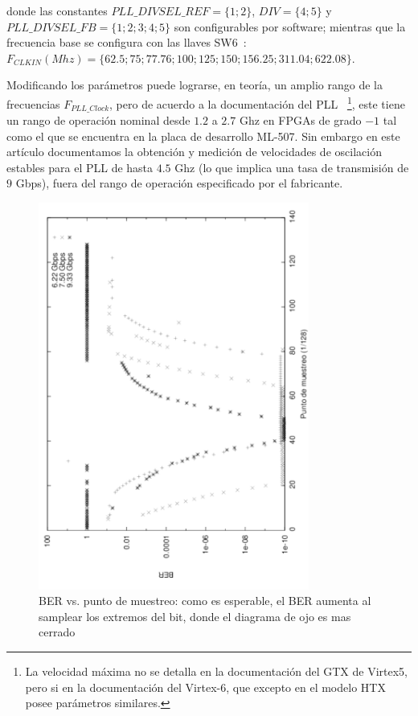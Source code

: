donde las constantes $PLL\_DIVSEL\_REF = \{1;2\}$, $DIV = \{4;5\} $ y
$PLL\_DIVSEL\_FB = \{1;2;3;4;5\}$ son configurables por software;
mientras que la frecuencia base se configura con las llaves
SW6~\cite[Tabla 1-32]{ug347}: $
F_{CLKIN} (Mhz)= \{62.5;75;77.76;100;125;150;156.25;311.04;622.08\}$.


 Modificando los parámetros puede lograrse, en teoría, un amplio rango
de la frecuencias $F_{PLL\_Clock}$, pero de acuerdo a la documentación
del PLL \cite[Pág. 71]{ug366}~\footnote{La velocidad máxima no se
detalla en la documentación del GTX de Virtex5, pero si en la
documentación del Virtex-6, que excepto en el modelo HTX posee parámetros
similares.}, este tiene un rango de operación nominal desde $1.2$ a
$2.7$ Ghz en FPGAs de grado $-1$ tal como el que se encuentra en la
placa de desarrollo ML-507. Sin embargo en este artículo documentamos la
obtención y medición de velocidades de oscilación estables para el PLL
de hasta $4.5$ Ghz (lo que implica una tasa de transmisión de $9$ Gbps),
fuera del rango de operación especificado por el fabricante.

\begin{figure}[t]
  \centering
    \includegraphics[width=3.5in,angle=270]{graphs/BER_sp_gray.pdf}
\caption {BER vs. punto de muestreo: como es esperable, el BER aumenta al samplear los extremos del bit, donde el diagrama de ojo es mas cerrado}
\label{fig:BERvsSamplingPoint}
\end{figure}

